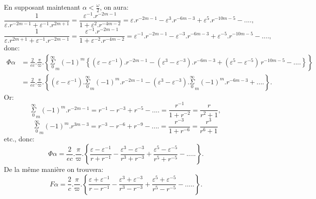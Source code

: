 \documentclass{article}
\begin{document}
En supposant maintenant $\alpha<\frac{\omega}{2}$, on aura:
\[
\frac{1}{\varepsilon.r^{-2m-1}+\varepsilon^{-1}.r^{2m+1}} = \frac{\varepsilon^{-1}.r^{-2m-1}}{1+\varepsilon^{2}.r^{-4m-2}} = \varepsilon.r^{-2m-1}-\varepsilon^{3}.r^{-6m-3}+\varepsilon^{5}.r^{-10m-5}-....,
\]
\[
\frac{1}{\varepsilon.r^{2m+1}+\varepsilon^{-1}.r^{-2m-1}} = \frac{\varepsilon^{-1}.r^{-2m-1}}{1+\varepsilon^{-2}.r^{-4m-2}} = \varepsilon^{-1}.r^{-2m-1}-\varepsilon^{-3}.r^{-6m-3}+\varepsilon^{-5}.r^{-10m-5}-....,
\]
donc:
\[
\begin{aligned}
\Phi\alpha &= \frac{2}{ec}.\frac{\pi}{\varpi}.\left\{\overset{\infty}{\underset{0}{\Sigma}}_{m}(-1)^{m}\left\{(\varepsilon-\varepsilon^{-1}).r^{-2m-1}-(\varepsilon^{3}-\varepsilon^{-3}).r^{-6m-3}+(\varepsilon^{5}-\varepsilon^{-5})\,r^{-10m-5}-....\right\}\right\}\\
&= \frac{2}{ec}.\frac{\pi}{\varpi}.\left\{(\varepsilon-\varepsilon^{-1}).\overset{\infty}{\underset{0}{\Sigma}}_{m}(-1)^{m}.r^{-2m-1}-(\varepsilon^{3}-\varepsilon^{-3}).\overset{\infty}{\underset{0}{\Sigma}}_{m}(-1)^{m}.r^{-6m-3}+....\right\}.
\end{aligned}
\]
Or:
\[
\overset{\infty}{\underset{0}{\Sigma}}_{m}(-1)^{m}.r^{-2m-1} = r^{-1}-r^{-3}+r^{-5}-.... = \frac{r^{-1}}{1+r^{-2}} = \frac{r}{r^{2}+1},
\]
\[
\overset{\infty}{\underset{0}{\Sigma}}_{m}(-1)^{m}.r^{3m-3} = r^{-3}-r^{-6}+r^{-9}-.... = \frac{r^{-3}}{1+r^{-6}} = \frac{r^{3}}{r^{6}+1}
\]
etc., donc:
\[
\Phi\alpha = \frac{2}{ec}.\frac{\pi}{\varpi}.\left\{\frac{\varepsilon-\varepsilon^{-1}}{r+r^{-1}}-\frac{\varepsilon^{3}-\varepsilon^{-3}}{r^{3}+r^{-3}}+\frac{\varepsilon^{5}-\varepsilon^{-5}}{r^{5}+r^{-5}}-.....\right\}.
\tag{204.}
\]
De la même manière on trouvera:
\[
F\alpha = \frac{2}{c}.\frac{\pi}{\varpi}.\left\{\frac{\varepsilon+\varepsilon^{-1}}{r-r^{-1}}-\frac{\varepsilon^{3}+\varepsilon^{-3}}{r^{3}-r^{-3}}+\frac{\varepsilon^{5}+\varepsilon^{-5}}{r^{5}-r^{-5}}-.....\right\}.
\tag{205.}
\]
\end{document}
